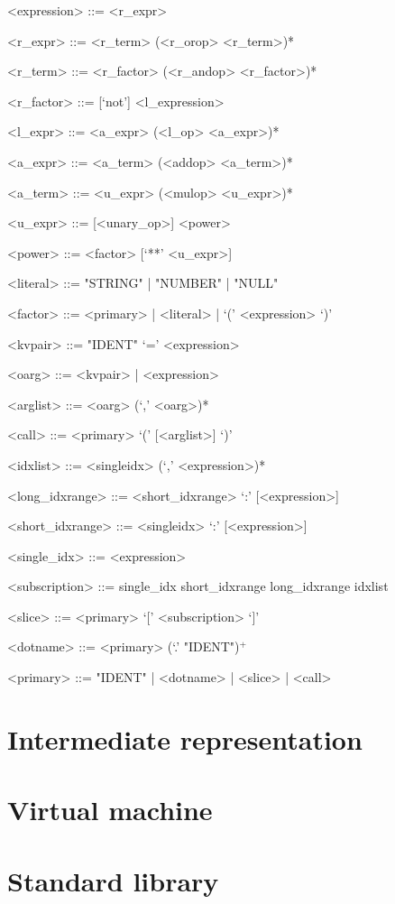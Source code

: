 \documentclass[10pt,a4paper]{article}
\begin{document}
\begin{grammar}
<expression> ::= <r_expr>

<r_expr> ::= <r_term> (<r_orop> <r_term>)*

<r_term> ::= <r_factor> (<r_andop> <r_factor>)*

<r_factor> ::= [`not'] <l_expression>

<l_expr> ::= <a_expr> (<l_op> <a_expr>)*

<a_expr> ::= <a_term> (<addop> <a_term>)*

<a_term> ::= <u_expr> (<mulop> <u_expr>)*

<u_expr> ::= [<unary_op>] <power>

<power> ::= <factor> [`**' <u_expr>]

<literal> ::= "STRING" | "NUMBER" | "NULL"

<factor> ::= <primary> | <literal> | `(' <expression> `)'

<kvpair> ::= "IDENT" `=' <expression>

<oarg> ::= <kvpair> | <expression>

<arglist> ::= <oarg> (`,' <oarg>)*

<call> ::= <primary> `(' [<arglist>] `)'

<idxlist> ::= <singleidx> (`,' <expression>)*

<long_idxrange> ::= <short_idxrange> `:' [<expression>]

<short_idxrange> ::= <singleidx> `:' [<expression>] 

<single_idx> ::= <expression>

<subscription> ::= single_idx 
	\alt short_idxrange 
	\alt long_idxrange 
	\alt idxlist

<slice> ::= <primary> `[' <subscription> `]'

<dotname> ::= <primary> (`.' "IDENT")$^{+}$

<primary> ::= "IDENT" | <dotname> | <slice> | <call>

\end{grammar}



\pagebreak

\section{Intermediate representation}

\pagebreak

\section{Virtual machine}

\pagebreak

\section{Standard library}
\end{document}
